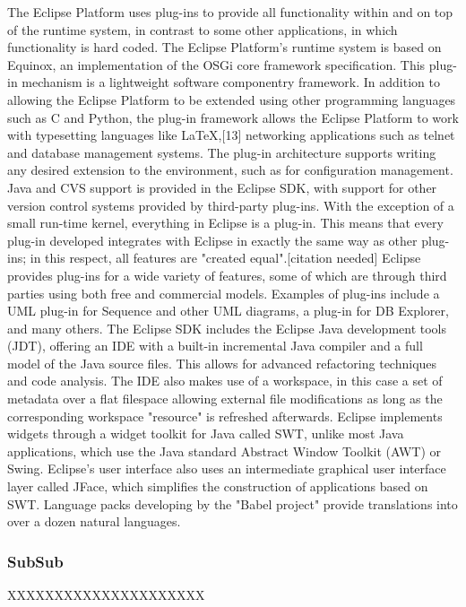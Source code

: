 The Eclipse Platform uses plug-ins to provide all functionality within and on top of the runtime system, in contrast to some other applications, in which functionality is hard coded. The Eclipse Platform's runtime system is based on Equinox, an implementation of the OSGi core framework specification.
This plug-in mechanism is a lightweight software componentry framework. In addition to allowing the Eclipse Platform to be extended using other programming languages such as C and Python, the plug-in framework allows the Eclipse Platform to work with typesetting languages like LaTeX,[13] networking applications such as telnet and database management systems. The plug-in architecture supports writing any desired extension to the environment, such as for configuration management. Java and CVS support is provided in the Eclipse SDK, with support for other version control systems provided by third-party plug-ins.
With the exception of a small run-time kernel, everything in Eclipse is a plug-in. This means that every plug-in developed integrates with Eclipse in exactly the same way as other plug-ins; in this respect, all features are "created equal".[citation needed] Eclipse provides plug-ins for a wide variety of features, some of which are through third parties using both free and commercial models. Examples of plug-ins include a UML plug-in for Sequence and other UML diagrams, a plug-in for DB Explorer, and many others.
The Eclipse SDK includes the Eclipse Java development tools (JDT), offering an IDE with a built-in incremental Java compiler and a full model of the Java source files. This allows for advanced refactoring techniques and code analysis. The IDE also makes use of a workspace, in this case a set of metadata over a flat filespace allowing external file modifications as long as the corresponding workspace "resource" is refreshed afterwards.
Eclipse implements widgets through a widget toolkit for Java called SWT, unlike most Java applications, which use the Java standard Abstract Window Toolkit (AWT) or Swing. Eclipse's user interface also uses an intermediate graphical user interface layer called JFace, which simplifies the construction of applications based on SWT.
Language packs developing by the "Babel project" provide translations into over a dozen natural languages.

\subsubsection{SubSub}
XXXXXXXXXXXXXXXXXXXXX 

